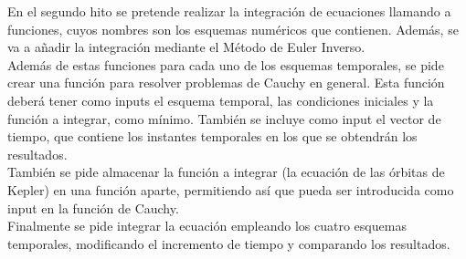 
En el segundo hito se pretende realizar la integración de ecuaciones llamando a funciones, cuyos nombres son los esquemas numéricos que contienen. Además, se va a añadir la integración mediante el Método de Euler Inverso. \\

Además de estas funciones para cada uno de los esquemas temporales, se pide crear una función para resolver problemas de Cauchy en general. Esta función deberá tener como inputs el esquema temporal, las condiciones iniciales y la función a integrar, como mínimo. También se incluye como input el vector de tiempo, que contiene los instantes temporales en los que se obtendrán los resultados. \\

También se pide almacenar la función a integrar (la ecuación de las órbitas de Kepler) en una función aparte, permitiendo así que pueda ser introducida como input en la función de Cauchy. \\

Finalmente se pide integrar la ecuación empleando los cuatro esquemas temporales, modificando el incremento de tiempo y comparando los resultados. 